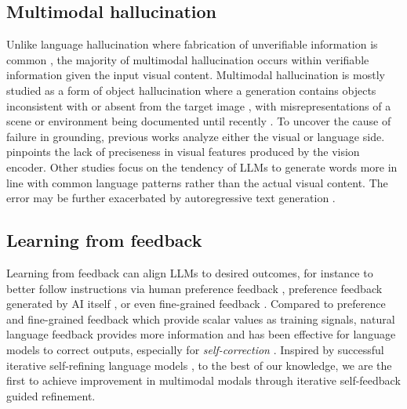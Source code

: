 \documentclass[11pt]{article}
\begin{document}
\subsection{Multimodal hallucination} 
\label{subsec:hal}
Unlike language hallucination where fabrication of unverifiable information is common \citep{10.1145/3571730,zhang2023sirens, li2023halueval}, the majority of multimodal hallucination occurs within verifiable information given the input visual content. Multimodal hallucination is mostly studied as a form of object hallucination where a generation contains objects inconsistent with or absent from the target image \citep{rohrbach-etal-2018-object, 9706727, li2023evaluating, liu2023mitigating, zhai2023halleswitch}, with misrepresentations of a scene or environment being documented until recently \citep{sun2023aligning}. To uncover the cause of failure in grounding, previous works analyze either the visual or language side. \citet{zhai2023halleswitch} pinpoints the lack of preciseness in visual features produced by the vision encoder. Other studies \citep{li2023evaluating, liu2023mitigating, wang2023evaluation} focus on the tendency of LLMs to generate words more in line with common language patterns rather than the actual visual content. The error may be further exacerbated by autoregressive text generation \citep{rohrbach-etal-2018-object, zhang2023language, zhou2023analyzing}. \\
\subsection{Learning from feedback}
\label{subsec:feedback}
Learning from feedback can align LLMs to desired outcomes, for instance to better follow instructions via human preference feedback \citep{ouyang2022training}, preference feedback generated by AI itself \citep{lee2023rlaif, dubois2023alpacafarm}, or even fine-grained feedback \citep{wu2023finegrained, lightman2023lets}. Compared to preference and fine-grained feedback which provide scalar values as training signals, natural language feedback provides more information \citep{scheurer2022training, ma2023eureka} and has been effective for language models to correct outputs, especially for \textit{self-correction} \citep{welleck2022generating, pan2023automatically}. Inspired by successful iterative self-refining language models \citep{madaan2023selfrefine, selfee2023, shinn2023reflexion}, to the best of our knowledge, we are the first to achieve improvement in multimodal modals through iterative self-feedback guided refinement.\\
\end{document}
